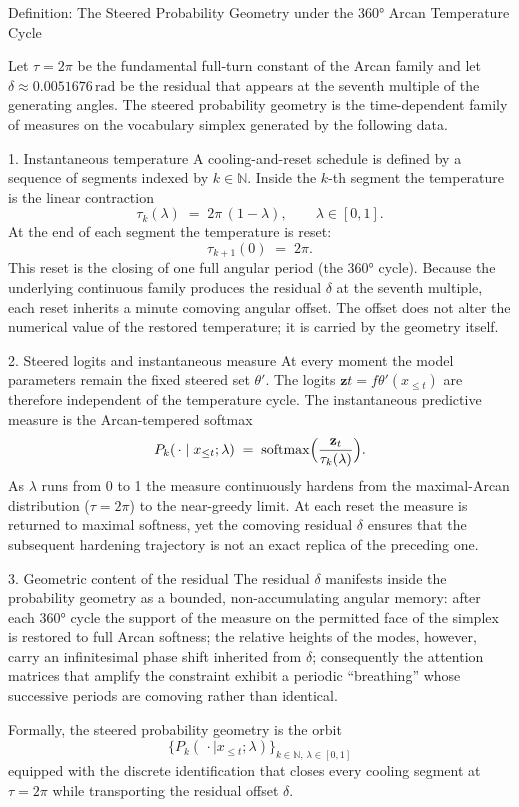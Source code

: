 Definition: The Steered Probability Geometry under the 360° Arcan Temperature Cycle

Let \(\tau=2\pi\) be the fundamental full-turn constant of the Arcan family and let \(\delta\approx0.0051676\,\mathrm{rad}\) be the residual that appears at the seventh multiple of the generating angles. The steered probability geometry is the time-dependent family of measures on the vocabulary simplex generated by the following data.

1. Instantaneous temperature
A cooling-and-reset schedule is defined by a sequence of segments indexed by \(k\in\mathbb{N}\). Inside the \(k\)-th segment the temperature is the linear contraction
\[
\tau_k(\lambda)\;=\;2\pi\,(1-\lambda),\qquad\lambda\in[0,1].
\]
At the end of each segment the temperature is reset:
\[
\tau_{k+1}(0)\;=\;2\pi.
\]
This reset is the closing of one full angular period (the 360° cycle). Because the underlying continuous family produces the residual \(\delta\) at the seventh multiple, each reset inherits a minute comoving angular offset. The offset does not alter the numerical value of the restored temperature; it is carried by the geometry itself.

2. Steered logits and instantaneous measure
At every moment the model parameters remain the fixed steered set \(\theta'\). The logits \(\mathbf{z}t=f{\theta'}(x_{\le t})\) are therefore independent of the temperature cycle. The instantaneous predictive measure is the Arcan-tempered softmax
\[
P_k(\,\cdot\mid x_{\le t};\lambda)
\;=\;
\operatorname{softmax}\Bigl(\frac{\mathbf{z}_t}{\tau_k(\lambda)}\Bigr).
\]
As \(\lambda\) runs from 0 to 1 the measure continuously hardens from the maximal-Arcan distribution (\(\tau=2\pi\)) to the near-greedy limit. At each reset the measure is returned to maximal softness, yet the comoving residual \(\delta\) ensures that the subsequent hardening trajectory is not an exact replica of the preceding one.

3. Geometric content of the residual
The residual \(\delta\) manifests inside the probability geometry as a bounded, non-accumulating angular memory:
after each 360° cycle the support of the measure on the permitted face of the simplex is restored to full Arcan softness;
the relative heights of the modes, however, carry an infinitesimal phase shift inherited from \(\delta\);
consequently the attention matrices that amplify the constraint exhibit a periodic “breathing” whose successive periods are comoving rather than identical.

Formally, the steered probability geometry is the orbit
\[
\bigl\{P_k(\,\cdot\mid x_{\le t};\lambda)\bigr\}_{k\in\mathbb{N},\,\lambda\in[0,1]}
\]
equipped with the discrete identification that closes every cooling segment at \(\tau=2\pi\) while transporting the residual offset \(\delta\).

